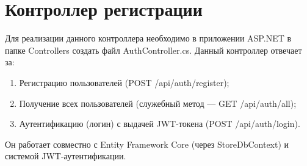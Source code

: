 \documentclass[12pt]{article}
\renewcommand{\texttt}[1]{{\small\ttfamily #1}}
\numberwithin{listing}{section}
\numberwithin{figure}{section}
\begin{document}
\newpage

\section{Контроллер регистрации}
Для реализации данного контроллера необходимо в приложении ASP.NET в папке \texttt{Controllers} создать файл \texttt{AuthController.cs}.
Данный контроллер отвечает за:
\begin{enumerate}
	\item Регистрацию пользователей (POST \texttt{/api/auth/register});
	\item Получение всех пользователей (служебный метод — GET \texttt{/api/auth/all});
	\item Аутентификацию (логин) с выдачей JWT-токена (POST \texttt{/api/auth/login}).
\end{enumerate}
Он работает совместно с Entity Framework Core (через \texttt{StoreDbContext}) и системой JWT-аутент\-ификации.
\end{document}
